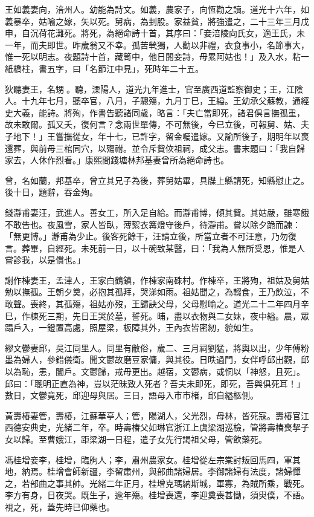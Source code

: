 \begin{pinyinscope}
王如義妻向，涪州人。幼能為詩文。如義，農家子，向恆勸之讀。道光十六年，如義暴卒，姑喻之嫁，矢以死。舅病，為刲股。家益貧，將強遣之，二十三年三月戊申，自沉荷花灘死。將死，為絕命詩十首，其序曰：「妾涪陵向氏女，適王氏，未一年，而夫即世。昨歲翁又不幸。孤苦煢獨，人勸以非禮，衣食事小，名節事大，惟一死以明志。夜題詩十首，藏笥中，他日閱妾詩，毋累阿姑也！」及入水，粘一紙橋柱，書五字，曰「名節江中見」，死時年二十五。

狄聽妻王，名甥。聽，溧陽人，道光九年進士，官至廣西道監察御史；王，江陰人。十九年七月，聽卒官，八月，子驄殤，九月丁巳，王縊。王幼承父蘇教，通經史大義，能詩。將殉，作書告聽諸同歲，略言：「夫亡當即死，諸君俱言撫孤重，故未敢爾。孤又夭，復何言？念兩世單傳，不可無後，今已立後，可報舅、姑、夫子地下！」王嘗撫從女，年十七，已許字，留金囑遣嫁。又諭所後子，期明年以喪還葬，與前母三棺同穴，以殤祔。並令斥貲佽祖祠，成父志。書末題曰：「我自歸家去，人休作烈看。」康熙間錢塘林邦基妻曾所為絕命詩也。

曾，名如蘭，邦基卒，曾立其兄子為後，葬舅姑畢，具牒上縣請死，知縣慰止之。後十日，題辭，吞金殉。

錢瀞甫妻汪，武進人。善女工，所入足自給。而瀞甫博，傾其貲。其姑嚴，雖寒餓不敢告也。夜風雪，家人皆臥，薄絮衣篝燈守後戶，待瀞甫。嘗以除夕跪而諫：「無更博。」瀞甫為少止。後客死餘干，汪請立後，所當立者不可汪意，乃勿復言。葬畢，自經死。未死前一日，以十碗致某醫，曰：「我為人無所受恩，惟是人嘗診我，以是償也。」

謝作棟妻王，孟津人，王家白鶴鎮，作棟家南硃村。作棟卒，王將殉，祖姑及舅姑勉以撫孤。王朝夕奠，必抱其孤拜，哭涕如雨。祖姑聞之，為輟食，王乃飲泣，不敢聲。喪終，其孤殤，祖姑亦歿，王歸訣父母，父母慰喻之。道光二十二年四月辛巳，作棟死三期，先日王哭於墓，誓死。晡，盡以衣物與二女妹，夜中縊。晨，眾蹋戶入，一鐙置高處，照屋梁，板障其外，王內衣皆密紉，貌如生。

繆文鬱妻邱，吳江同里人。同里有敝俗，歲二、三月祠劉猛，將輿以出，少年傅粉墨為婦人，參錯儀衛。聞文鬱故磨豆家傭，與其役。日昳過門，女伴呼邱出觀，邱以為恥，恚，闔戶。文鬱歸，戒毋更出。越宿，文鬱病，或恫以「神怒，且死」。邱曰：「聰明正直為神，豈以茫昧致人死者？吾夫未即死，即死，吾與俱死耳！」數日，文鬱竟死，邱迎母與居。三日，語母入市市楮，邱自縊柩側。

黃壽椿妻管，壽椿，江蘇華亭人；管，陽湖人，父光烈，母林，皆死寇。壽椿官江西德安典史，光緒二年，卒。時壽椿父如琳官浙江上虞梁湖巡檢，管將壽椿喪挈子女以歸。至曹娥江，距梁湖一日程，遣子女先行謁祖父母，管飲藥死。

馮桂增妾李，桂增，臨朐人；李，肅州農家女。桂增從左宗棠討叛回馬四，軍其地，納焉。桂增會師新疆，李留肅州，與部曲諸婦居。李御諸婦有法度，諸婦憚之，若部曲之事其帥。光緒二年正月，桂增克瑪納斯城，軍寡，為賊所乘，戰死。李方有身，日夜哭。既生子，逾年殤。桂增喪還，李迎奠喪甚慟，須臾僕，不語。視之，死，蓋先時已仰藥也。


\end{pinyinscope}
